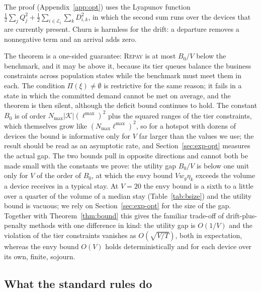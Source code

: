 \documentclass[preprint,11pt]{elsarticle}
\theoremstyle{definition}
\theoremstyle{remark}
\newcommand{\cK}{\mathcal{K}}
\newcommand{\cE}{\mathcal{E}}
\newcommand{\repay}{\textsc{Repay}}
\begin{document}
The proof (Appendix~\ref{app:opt}) uses the Lyapunov function $\tfrac12\sum_jQ_j^2+\tfrac12\sum_{i\in\cE_t}\sum_kD_{i,k}^2$, in which the second sum runs over the devices that are currently present.
Churn is harmless for the drift: a departure removes a nonnegative term and an arrival adds zero.

The theorem is a one-sided guarantee: \repay{} is at most $B_0/V$ below the benchmark, and it may be above it, because its tier queues balance the business constraints across population states while the benchmark must meet them in each.
The condition $\Pi(\xi)\neq\emptyset$ is restrictive for the same reason; it fails in a state in which the committed demand cannot be met on average, and the theorem is then silent, although the deficit bound continues to hold.
The constant $B_0$ is of order $N_{\max}|\cK|(\ell^{\max})^2$ plus the squared ranges of the tier constraints, which themselves grow like $(N_{\max}\ell^{\max})^2$, so for a hotspot with dozens of devices the bound is informative only for $V$ far larger than the values we use; the result should be read as an asymptotic rate, and Section~\ref{sec:exp-opt} measures the actual gap.
The two bounds pull in opposite directions and cannot both be made small with the constants we prove: the utility gap $B_0/V$ is below one unit only for $V$ of the order of $B_0$, at which the envy bound $Vw_g\eta_k$ exceeds the volume a device receives in a typical stay. At $V=20$ the envy bound is a sixth to a little over a quarter of the volume of a median stay (Table~\ref{tab:bsize}) and the utility bound is vacuous; we rely on Section~\ref{sec:exp-opt} for the size of the gap.
Together with Theorem~\ref{thm:bound} this gives the familiar trade-off of drift-plus-penalty methods with one difference in kind: the utility gap is $O(1/V)$ and the violation of the tier constraints vanishes as $O(\sqrt{V/T})$, both in expectation, whereas the envy bound $O(V)$ holds deterministically and for each device over its own, finite, sojourn.

\subsection{What the standard rules do}\label{sec:baselines-theory}
\end{document}
